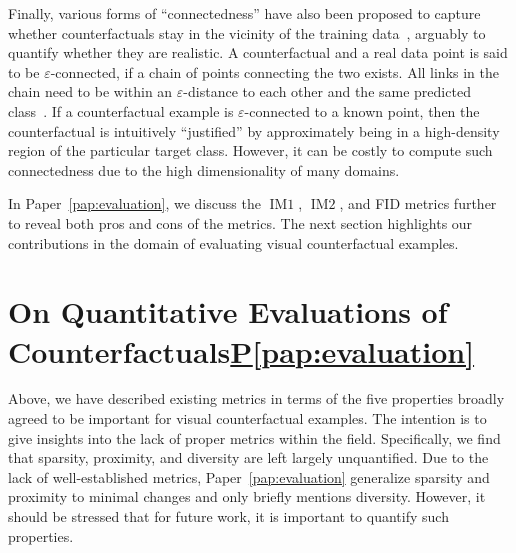 \documentclass[11pt,a4paper,twoside,openright,final]{memoir}
\newcommand\contribution[1]{\hspace{0.5em}\hyperref[#1]{P\ref{#1}}}
\newcommand*{\paperref}[1]{Paper~\hyperref[#1]{\ref{#1}}}
\begin{document}
Finally, various forms of ``connectedness'' have also been proposed to capture whether counterfactuals stay in the vicinity of the training data~\cite{Laugel2019, Pawelczyk2020, Poyiadzi2020}, arguably to quantify whether they are realistic. 
A counterfactual and a real data point is said to be $\varepsilon$-connected, if a chain of points connecting the two exists. 
All links in the chain need to be within an $\varepsilon$-distance to each other and the same predicted class~\cite{Laugel2019}.
If a counterfactual example is $\varepsilon$-connected to a known point, then the counterfactual is intuitively ``justified'' by approximately being in a high-density region of the particular target class. 
However, it can be costly to compute such connectedness due to the high dimensionality of many domains.%

In \paperref{pap:evaluation}, we discuss the $\operatorname{IM1}$, $\operatorname{IM2}$, and FID metrics further to reveal both pros and cons of the metrics.
The next section highlights our contributions in the domain of evaluating visual counterfactual examples. 

\section[On Quantitative Evaluations of Counterfactuals]{On Quantitative Evaluations of Counterfactuals\contribution{pap:evaluation}}\label{sec:evaluation-paper}

Above, we have described existing metrics in terms of the five properties broadly agreed to be important for visual counterfactual examples.
The intention is to give insights into the lack of proper metrics within the field. 
Specifically, we find that sparsity, proximity, and diversity are left largely unquantified. 
Due to the lack of well-established metrics, \paperref{pap:evaluation} generalize sparsity and proximity to minimal changes and only briefly mentions diversity. 
However, it should be stressed that for future work, it is important to quantify such properties.
\end{document}
